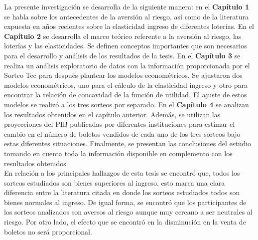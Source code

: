 La presente investigación se desarrolla de la siguiente manera: en el \textbf{Capítulo 1} se habla sobre los antecedentes de la aversión al riesgo, así como de la literatura expuesta en años recientes sobre la elasticidad ingreso de diferentes loterías. En el \textbf{Capítulo 2} se desarrolla el marco teórico referente a la aversión al riesgo, las loterías y las elasticidades. Se definen conceptos importantes que son necesarios para el desarrollo y análisis de los resultados de la tesis. En el \textbf{Capítulo 3} se realiza un análisis exploratorio de datos con la información proporcionada por el Sorteo Tec para después plantear los modelos econométricos. Se ajustaron dos modelos econométricos, uno para el cálculo de la elasticidad ingreso y otro para encontrar la relación de concavidad de la función de utilidad. El ajuste de estos modelos se realizó a los tres sorteos por separado. En el \textbf{Capítulo 4} se analizan los resultados obtenidos en el capítulo anterior. Además, se utilizan las proyecciones del PIB publicadas por diferentes instituciones para estimar el cambio en el número de boletos vendidos de cada uno de los tres sorteos bajo estas diferentes situaciones. Finalmente, se presentan las conclusiones del estudio tomando en cuenta toda la información disponible en complemento con los resultados obtenidos. \\

En relación a los principales hallazgos de esta tesis se encontró que, todos los sorteos estudiados son bienes superiores al ingreso, esto marca una clara diferencia entre la literatura citada en donde los sorteos estudiados todos son bienes normales al ingreso. De igual forma, se encontró que los participantes de los sorteos analizados son aversos al riesgo aunque muy cercano a ser neutrales al riesgo. Por otro lado, el efecto que se encontró en la disminución en la venta de boletos no será proporcional.



